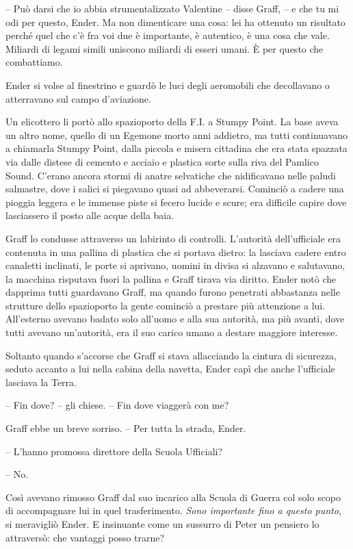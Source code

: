 {-- Può darsi che io abbia strumentalizzato Valentine -- disse Graff, --
	e che tu mi odi per questo, Ender. Ma non dimenticare una cosa: lei ha
	ottenuto un risultato perché quel che c'è fra voi due è importante, è
	autentico, è una cosa che vale. Miliardi di legami simili uniscono
	miliardi di esseri umani. È per questo che combattiamo.}

{Ender si volse al finestrino e guardò le luci degli aeromobili che
	decollavano o atterravano sul campo d'aviazione.}

{Un elicottero li portò allo spazioporto della F.I. a Stumpy Point. La
	base aveva un altro nome, quello di un Egemone morto anni addietro, ma
	tutti continuavano a chiamarla Stumpy Point, dalla piccola e misera
	cittadina che era stata spazzata via dalle distese di cemento e acciaio
	e plastica sorte sulla riva del Pamlico Sound. C'erano ancora stormi di
	anatre selvatiche che nidificavano nelle paludi salmastre, dove i salici
	si piegavano quasi ad abbeverarsi. Cominciò a cadere una pioggia leggera
	e le immense piste si fecero lucide e scure; era difficile capire dove
	lasciassero il posto alle acque della baia.}

{Graff lo condusse attraverso un labirinto di controlli. L'autorità
	dell'ufficiale era contenuta in una pallina di plastica che si portava
	dietro: la lasciava cadere entro canaletti inclinati, le porte si
	aprivano, uomini in divisa si alzavano e salutavano, la macchina
	risputava fuori la pallina e Graff tirava via diritto. Ender notò che
	dapprima tutti guardavano Graff, ma quando furono penetrati abbastanza
	nelle strutture dello spazioporto la gente cominciò a prestare più
	attenzione a lui. All'esterno avevano badato solo all'uomo e alla sua
	autorità, ma più avanti, dove tutti avevano un'autorità, era il suo
	carico umano a destare maggiore interesse.}

{Soltanto quando s'accorse che Graff si stava allacciando la cintura di
	sicurezza, seduto accanto a lui nella cabina della navetta, Ender capì
	che anche l'ufficiale lasciava la Terra.}

{-- Fin dove? -- gli chiese. -- Fin dove viaggerà con me?}

{Graff ebbe un breve sorriso. -- Per tutta la strada, Ender.}

{-- L'hanno promossa direttore della Scuola Ufficiali?}

{-- No.}

{Così avevano rimosso Graff dal suo incarico alla Scuola di Guerra col
	solo scopo di accompagnare lui in quel trasferimento. \emph{Sono
		importante fino a questo punto}, \emph{} si meravigliò Ender. E
	insinuante come un sussurro di Peter un pensiero lo attraversò: che
	vantaggi posso trarne?}

